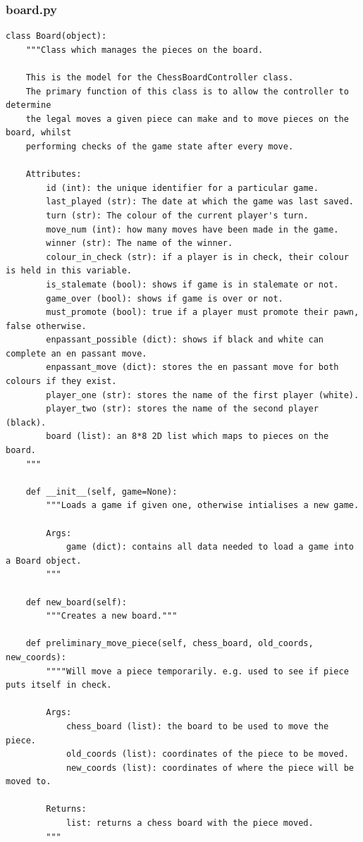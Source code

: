 \documentclass[twoside, 12pt]{report}
\begin{document}
\subsubsection{board.py}
\begin{verbatim}
class Board(object):
    """Class which manages the pieces on the board.

	This is the model for the ChessBoardController class.
	The primary function of this class is to allow the controller to determine
	the legal moves a given piece can make and to move pieces on the board, whilst
	performing checks of the game state after every move.
	
	Attributes:
		id (int): the unique identifier for a particular game.
		last_played (str): The date at which the game was last saved.
		turn (str): The colour of the current player's turn.
		move_num (int): how many moves have been made in the game.
		winner (str): The name of the winner.
		colour_in_check (str): if a player is in check, their colour is held in this variable.
		is_stalemate (bool): shows if game is in stalemate or not.
		game_over (bool): shows if game is over or not.
		must_promote (bool): true if a player must promote their pawn, false otherwise.
		enpassant_possible (dict): shows if black and white can complete an en passant move.
		enpassant_move (dict): stores the en passant move for both colours if they exist.
		player_one (str): stores the name of the first player (white).
		player_two (str): stores the name of the second player (black).
		board (list): an 8*8 2D list which maps to pieces on the board.
	"""
	
	def __init__(self, game=None):
		"""Loads a game if given one, otherwise intialises a new game.
	
		Args:
			game (dict): contains all data needed to load a game into a Board object.
		"""
		
    def new_board(self):
		"""Creates a new board."""
		
	def preliminary_move_piece(self, chess_board, old_coords, new_coords):
		""""Will move a piece temporarily. e.g. used to see if piece puts itself in check.
	
		Args:
			chess_board (list): the board to be used to move the piece.
			old_coords (list): coordinates of the piece to be moved.
			new_coords (list): coordinates of where the piece will be moved to.
		
		Returns:
			list: returns a chess board with the piece moved.
		"""
		

\end{verbatim}
\end{document}
